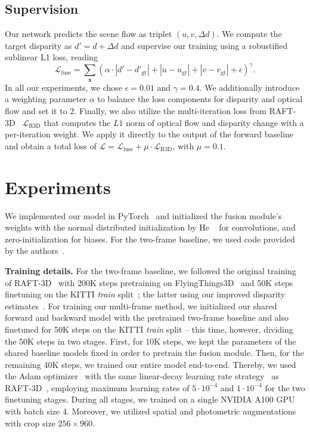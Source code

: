 \documentclass[10pt,twocolumn,letterpaper]{article}
\begin{document}
\subsection{Supervision}
Our network predicts the scene flow as triplet $(u,v,\Delta d)$.
We compute the target disparity as $d' \!=\! d \!+\! \Delta d$ and supervise our training using a robustified sublinear L1 loss, reading
\begin{equation}
\mathcal{L}_\text{fuse} \!=\! \sum_\mathbf{x} \left( \alpha \cdot | d' \!-\! d'_\text{gt} | + | u \!-\! u_\text{gt} | + | v \!-\! v_\text{gt} | + \epsilon \right)^\gamma.
\end{equation}
In all our experiments, we chose $\epsilon=0.01$ and $\gamma=0.4$.
We additionally introduce a weighting parameter $\alpha$ to balance the loss components for disparity and optical flow and set it to 2.
Finally, we also utilize the multi-iteration loss from RAFT-3D~\cite{Teed2021_RAFT3D} $\mathcal{L}_\text{R3D}$ that computes the $L1$ norm of optical flow and disparity change with
a per-iteration weight.
We apply it directly to the output of the forward baseline and obtain a total loss of $\mathcal{L} = \mathcal{L}_\text{fuse} + \mu \cdot \mathcal{L}_\text{R3D}$, with $\mu=0.1$.




\section{Experiments}
We implemented our model in PyTorch~\cite{Paszke2019_pytorch} and initialized the fusion module's weights with the normal distributed initialization by He \etal~\cite{He2015_init} for convolutions, and zero-initialization for biases.
For the two-frame baseline, we used code provided by the authors~\cite{Teed2021_RAFT3D}.


\medskip
\noindent
\textbf{Training details.}
For the two-frame baseline, we followed the original training of RAFT-3D~\cite{Teed2021_RAFT3D} with 200K steps pretraining on FlyingThings3D~\cite{Mayer2016_SceneFlow} and 50K steps finetuning on the KITTI \emph{train} split~\cite{Menze2015_KITTI}; the latter using our improved disparity estimates~\cite{Cheng2020_LEAStereo}.
For training our multi-frame method, we initialized our shared forward and backward model with the pretrained two-frame baseline and also finetuned for 50K steps on the KITTI \emph{train} split -- this time, however, dividing the 50K steps in two stages.
First, for 10K steps, we kept the parameters of the shared baseline models fixed in order to pretrain the fusion module.
Then, for the remaining 40K steps, we trained our entire model end-to-end.
Thereby, we used the Adam optimizer~\cite{Kingma2015_Adam} with the same linear-decay learning rate strategy~\cite{Smith2019_OneCycleLR} as RAFT-3D~\cite{Teed2021_RAFT3D}, employing maximum learning rates of $5\cdot 10^{-4}$ and $1\cdot 10^{-4}$ for the two finetuning stages.
During all stages, we trained on a single NVIDIA A100 GPU with batch size 4.
Moreover, we utilized spatial and photometric augmentations~\cite{Teed2021_RAFT3D} with crop size $256 \times 960$.
\end{document}
